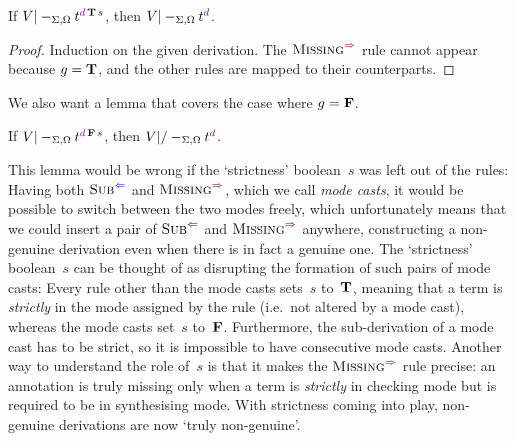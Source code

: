 \begin{lemma}\label{thm:Pre?-true}
If\/ $V |-_{\Sigma,\Omega} t^{\dir{d}\,\BTrue\,s}$, then $V |-_{\Sigma,\Omega} t^\dir{d}$.
\end{lemma}

\begin{proof}
Induction on the given derivation.
The $\SynRule{Missing}$ rule cannot appear because $g = \mathbf{T}$, and the other rules are mapped to their counterparts.
\end{proof}

We also want a lemma that covers the case where $g = \mathbf{F}$.

\begin{lemma}\label{thm:Pre?-false}
If\/ $V |-_{\Sigma,\Omega} t^{\dir{d}\,\BFalse\,s}$, then $V |/-_{\Sigma,\Omega} t^\dir{d}$.
\end{lemma}

This lemma would be wrong if the `strictness' boolean~$s$ was left out of the rules:
Having both $\ChkRule{Sub}$ and $\SynRule{Missing}$, which we call \emph{mode casts}, it would be possible to switch between the two modes freely, which unfortunately means that we could insert a pair of $\ChkRule{Sub}$ and $\SynRule{Missing}$ anywhere, constructing a non-genuine derivation even when there is in fact a genuine one.
The `strictness' boolean~$s$ can be thought of as disrupting the formation of such pairs of mode casts:
Every rule other than the mode casts sets~$s$ to~$\mathbf{T}$, meaning that a term is \emph{strictly} in the mode assigned by the rule (i.e.~not altered by a mode cast), whereas the mode casts set~$s$ to~$\mathbf{F}$.
Furthermore, the sub-derivation of a mode cast has to be strict, so it is impossible to have consecutive mode casts.
Another way to understand the role of~$s$ is that it makes the $\SynRule{Missing}$ rule precise: an annotation is truly missing only when a term is \emph{strictly} in checking mode but is required to be in synthesising mode.
With strictness coming into play, non-genuine derivations are now `truly non-genuine'.

